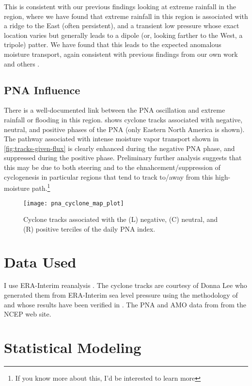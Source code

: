 \documentclass[12pt]{article}
\begin{document}
This is consistent with our previous findings looking at extreme rainfall in the region, where we have found that extreme rainfall in this region is associated with a ridge to the East (often persistent), and a transient low pressure whose exact location varies but generally leads to a dipole (or, looking farther to the West, a tripole) patter.
We have found that this leads to the expected anomalous moisture transport, again consistent with previous findings from our own work and others \citep{Nakamura2012,Lavers2013a,Steinschneider2016a}.


\subsection{PNA Influence}

There is a well-documented \citep[ie][]{Nakamura2012,Robertson2015,Steinschneider2015a} link between the PNA oscillation and extreme rainfall or flooding in this region.
 shows cyclone tracks associated with negative, neutral, and positive phases of the PNA (only Eastern North America is shown).
The pathway associated with intense moisture vapor transport shown in \cref{fig:tracks-given-flux} is clearly enhanced during the negative PNA phase, and suppressed during the positive phase.
Preliminary further analysis suggests that this may be due to both steering and to the ehnahcement/suppression of cyclogenesis in particular regions that tend to track to/away from this high-moisture path.\footnote{If you know more about this, I'd be interested to learn more}

\begin{figure}
    \centering
    \texttt{[image: pna\_cyclone\_map\_plot]}
    \caption{Cyclone tracks associated with the (L) negative, (C) neutral, and (R) positive terciles of the daily PNA index.}
    \label{fig:tracks-given-pna}
\end{figure}

\section{Data Used}

I use ERA-Interim reanalysis \cite{Dee2011}.
The cyclone tracks are courtesy of Donna Lee who generated them from ERA-Interim sea level pressure using the methodology of \citet{Hodges1994} and whose results have been verified in \cite{Booth2015}.
The PNA and AMO data from from the NCEP web site.

\section{Statistical Modeling}
\end{document}
